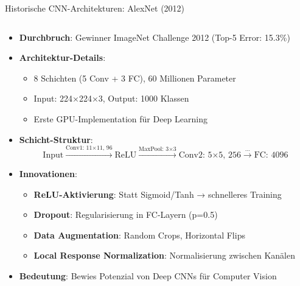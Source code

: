 \documentclass[aspectratio=1610, xcolor=dvipsnames, 9pt]{beamer}
\begin{document}
      \begin{frame}{Historische CNN-Architekturen: AlexNet (2012)}
        \begin{columns}
          \begin{column}{1\textwidth}
            \begin{itemize}
              \item \textbf{Durchbruch}: Gewinner ImageNet Challenge 2012 (Top-5 Error: 15.3\%)
              \item \textbf{Architektur-Details}:
              \begin{itemize}
                \item 8 Schichten (5 Conv + 3 FC), 60 Millionen Parameter
                \item Input: 224×224×3, Output: 1000 Klassen
                \item Erste GPU-Implementation für Deep Learning
              \end{itemize}
              \item \textbf{Schicht-Struktur}:
              \begin{equation}
                \text{Input} \xrightarrow{\text{Conv1: 11×11, 96}} \text{ReLU} \xrightarrow{\text{MaxPool: 3×3}} \text{Conv2: 5×5, 256} \xrightarrow{\text{...}} \text{FC: 4096}
              \end{equation}
              \item \textbf{Innovationen}:
              \begin{itemize}
                \item \textbf{ReLU-Aktivierung}: Statt Sigmoid/Tanh → schnelleres Training
                \item \textbf{Dropout}: Regularisierung in FC-Layern (p=0.5)
                \item \textbf{Data Augmentation}: Random Crops, Horizontal Flips
                \item \textbf{Local Response Normalization}: Normalisierung zwischen Kanälen
              \end{itemize}
              \item \textbf{Bedeutung}: Bewies Potenzial von Deep CNNs für Computer Vision
            \end{itemize}
          \end{column}
        \end{columns}
      \end{frame}
\end{document}
